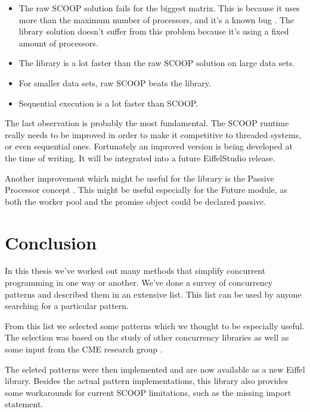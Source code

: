 \documentclass[a4paper,10pt]{article}
\newcommand{\todoref}{\todo{ref}}
\begin{document}
\begin{itemize}
 \item The raw SCOOP solution fails for the biggest matrix. 
 This is because it uses more than the maximum number of processors, and it's a known bug .
 The library solution doesn't suffer from this problem because it's using a fixed amount of processors.
 \item The library is a lot faster than the raw SCOOP solution on large data sets.
 \item For smaller data sets, raw SCOOP beats the library.
 \item Sequential execution is a lot faster than SCOOP.
\end{itemize}

The last observation is probably the most fundamental.
The SCOOP runtime really needs to be improved in order to make it competitive to threaded systems, or even sequential ones.
Fortunately an improved version  is being developed at the time of writing.
It will be integrated into a future EiffelStudio release.

Another improvement which might be useful for the library is the Passive Processor concept \todoref.
This might be useful especially for the Future module, as both the worker pool and the promise object could be declared passive.

\section{Conclusion}

In this thesis we've worked out many methods that simplify concurrent programming in one way or another.
We've done a survey of concurrency patterns and described them in an extensive list.
This list can be used by anyone searching for a particular pattern.

From this list we selected some patterns which we thought to be especially useful.
The selection was based on the study of other concurrency libraries as well as some input from the CME research group \todoref.

The seleted patterns were then implemented and are now available as a new Eiffel library.
Besides the actual pattern implementations, this library also provides some workarounds for current SCOOP limitations, such as the missing import statement.
\end{document}
